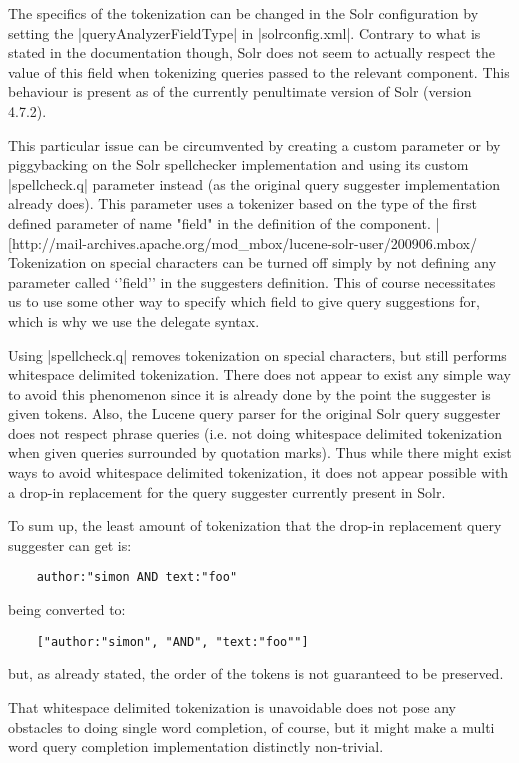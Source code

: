 The specifics of the tokenization can be changed in the Solr configuration by setting the |queryAnalyzerFieldType| in |solrconfig.xml|. Contrary to what is stated in the documentation though, Solr does not seem to actually respect the value of this field when tokenizing queries passed to the relevant component. This behaviour is present as of the currently penultimate version of Solr (version 4.7.2).

This particular issue can be circumvented by creating a custom parameter or by piggybacking on the Solr spellchecker implementation and using its custom |spellcheck.q| parameter instead (as the original query suggester implementation already does).
This parameter uses a tokenizer based on the type of the first defined parameter of name "field" in the definition of the component. |[http://mail-archives.apache.org/mod_mbox/lucene-solr-user/200906.mbox/%
Tokenization on special characters can be turned off simply by not defining any parameter called ‘’field’’ in the suggesters definition. This of course necessitates us to use some other way to specify which field to give query suggestions for, which is why we use the delegate syntax.

Using |spellcheck.q| removes tokenization on special characters, but still performs whitespace delimited tokenization. There does not appear to exist any simple way to avoid this phenomenon since it is already done by the point the suggester is given tokens. Also, the Lucene query parser for the original Solr query suggester does not respect phrase queries (i.e. not doing whitespace delimited tokenization when given queries surrounded by quotation marks). Thus while there might exist ways to avoid whitespace delimited tokenization, it does not appear possible with a drop-in replacement for the query suggester currently present in Solr.

To sum up, the least amount of tokenization that the drop-in replacement query suggester can get is:
\begin{verbatim}
    author:"simon AND text:"foo"
\end{verbatim}

being converted to:
\begin{verbatim}
    ["author:"simon", "AND", "text:"foo""]
\end{verbatim}

but, as already stated, the order of the tokens is not guaranteed to be preserved.

That whitespace delimited tokenization is unavoidable does not pose any obstacles to doing single word completion, of course, but it might make a multi word query completion implementation distinctly non-trivial. 

